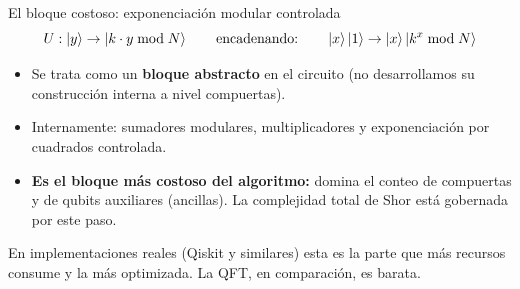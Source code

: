 \documentclass[aspectratio=169]{beamer}
\begin{document}
\begin{frame}{El bloque costoso: exponenciación modular controlada}
  \[
    U:\ket{y}\to\ket{k\cdot y\bmod N}
    \qquad\text{encadenando:}\qquad
    \ket{x}\ket{1}\to\ket{x}\ket{k^x\bmod N}
  \]

  \begin{itemize}
    \item Se trata como un \textbf{bloque abstracto} en el circuito
          (no desarrollamos su construcción interna a nivel compuertas).
    \item Internamente: sumadores modulares, multiplicadores y exponenciación
          por cuadrados controlada.
    \item \textbf{Es el bloque más costoso del algoritmo:} domina el conteo
          de compuertas y de qubits auxiliares (ancillas). La complejidad total
          de Shor está gobernada por este paso.
  \end{itemize}

  \begin{block}{}
    \small En implementaciones reales (Qiskit y similares) esta es la parte
    que más recursos consume y la más optimizada. La QFT, en comparación,
    es barata.
  \end{block}

\end{frame}
\end{document}
